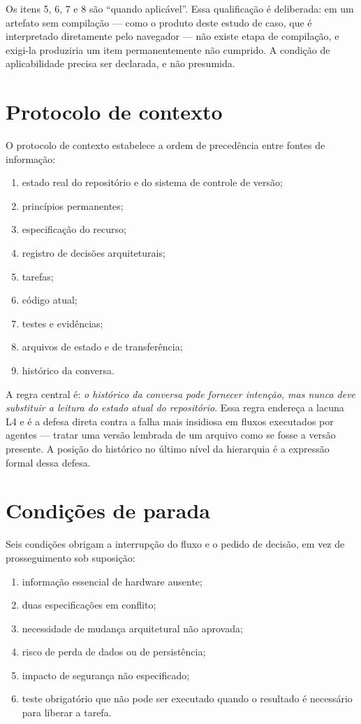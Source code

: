 Os itens 5, 6, 7 e 8 são ``quando aplicável''. Essa qualificação é deliberada: em
um artefato sem compilação --- como o produto deste estudo de caso, que é
interpretado diretamente pelo navegador --- não existe etapa de compilação, e
exigi-la produziria um item permanentemente não cumprido. A condição de
aplicabilidade precisa ser declarada, e não presumida.

\section{Protocolo de contexto}
\label{sec:fw-contexto}

O protocolo de contexto estabelece a ordem de precedência entre fontes de
informação:

\begin{enumerate}
	\item estado real do repositório e do sistema de controle de versão;
	\item princípios permanentes;
	\item especificação do recurso;
	\item registro de decisões arquiteturais;
	\item tarefas;
	\item código atual;
	\item testes e evidências;
	\item arquivos de estado e de transferência;
	\item histórico da conversa.
\end{enumerate}

A regra central é: \emph{o histórico da conversa pode fornecer intenção, mas nunca
deve substituir a leitura do estado atual do repositório}. Essa regra endereça a
lacuna L4 e é a defesa direta contra a falha mais insidiosa em fluxos executados
por agentes --- tratar uma versão lembrada de um arquivo como se fosse a versão
presente. A posição do histórico no último nível da hierarquia é a expressão
formal dessa defesa.

\section{Condições de parada}
\label{sec:fw-parada}

Seis condições obrigam a interrupção do fluxo e o pedido de decisão, em vez de
prosseguimento sob suposição:

\begin{enumerate}
	\item informação essencial de hardware ausente;
	\item duas especificações em conflito;
	\item necessidade de mudança arquitetural não aprovada;
	\item risco de perda de dados ou de persistência;
	\item impacto de segurança não especificado;
	\item teste obrigatório que não pode ser executado quando o resultado é necessário para liberar a tarefa.
\end{enumerate}

